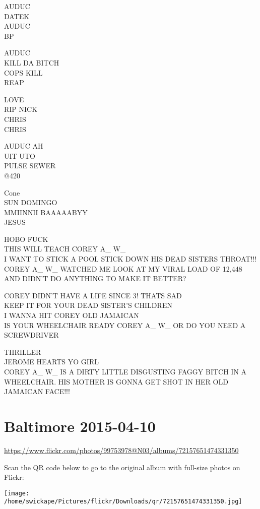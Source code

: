 \documentclass[10pt,letterpaper]{article}
\begin{document}
AUDUC\\
DATEK\\
AUDUC\\
BP

AUDUC\\
KILL DA BITCH\\
COPS KILL\\
REAP

LOVE\\
RIP NICK\\
CHRIS\\
CHRIS

AUDUC AH\\
UIT UTO\\
PULSE SEWER\\
@420

Cone\\
SUN DOMINGO\\
MMIINNII BAAAAABYY\\
JESUS

HOBO FUCK\\
THIS WILL TEACH COREY A\_ W\_\\
I WANT TO STICK A POOL STICK DOWN HIS DEAD SISTERS THROAT!!!\\
COREY A\_ W\_ WATCHED ME LOOK AT MY VIRAL LOAD OF 12,448 AND DIDN'T DO ANYTHING TO MAKE IT BETTER?

COREY DIDN'T HAVE A LIFE SINCE 3!  THATS SAD\\
KEEP IT FOR YOUR DEAD SISTER'S CHILDREN\\
I WANNA HIT COREY OLD JAMAICAN\\
IS YOUR WHEELCHAIR READY COREY A\_ W\_ OR DO YOU NEED A SCREWDRIVER

THRILLER\\
JEROME HEARTS YO GIRL\\
COREY A\_ W\_ IS A DIRTY LITTLE DISGUSTING FAGGY BITCH IN A WHEELCHAIR.  HIS MOTHER IS GONNA GET SHOT IN HER OLD JAMAICAN FACE!!!


\section*{Baltimore 2015-04-10}

\url{https://www.flickr.com/photos/99753978@N03/albums/72157651474331350}

Scan the QR code below to go to the original album with full-size photos on Flickr:

\texttt{[image: /home/swickape/Pictures/flickr/Downloads/qr/72157651474331350.jpg]}
\end{document}
